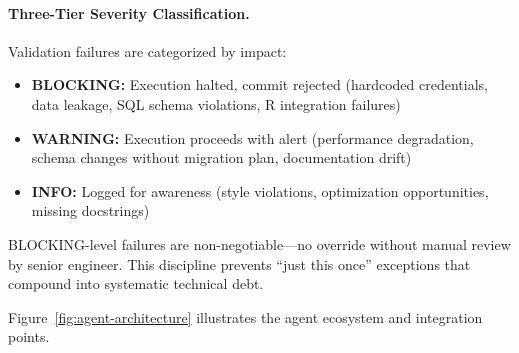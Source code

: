 \paragraph{Three-Tier Severity Classification.}
Validation failures are categorized by impact:

\begin{itemize}[itemsep=2pt,parsep=0pt]
    \item \textbf{BLOCKING:} Execution halted, commit rejected (hardcoded credentials, data leakage, SQL schema violations, R integration failures)
    \item \textbf{WARNING:} Execution proceeds with alert (performance degradation, schema changes without migration plan, documentation drift)
    \item \textbf{INFO:} Logged for awareness (style violations, optimization opportunities, missing docstrings)
\end{itemize}

BLOCKING-level failures are non-negotiable---no override without manual review by senior engineer. This discipline prevents ``just this once'' exceptions that compound into systematic technical debt.

Figure~\ref{fig:agent-architecture} illustrates the agent ecosystem and integration points.

